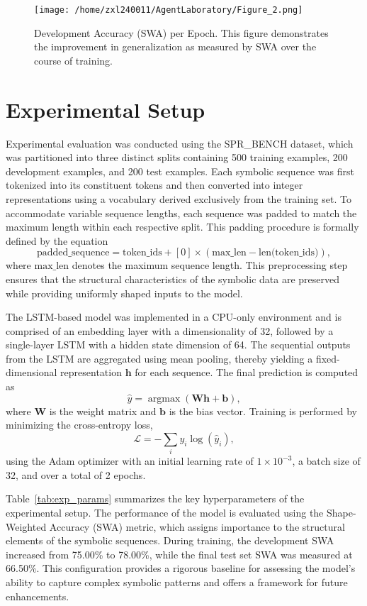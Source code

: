 \documentclass{article}
\begin{document}
\begin{figure}[h]
\caption{Development Accuracy (SWA) per Epoch. This figure demonstrates the improvement in generalization as measured by SWA over the course of training.}
\centering
\texttt{[image: /home/zxl240011/AgentLaboratory/Figure\_2.png]}
\label{fig:fig2}
\end{figure}

\section{Experimental Setup}
Experimental evaluation was conducted using the SPR\_BENCH dataset, which was partitioned into three distinct splits containing 500 training examples, 200 development examples, and 200 test examples. Each symbolic sequence was first tokenized into its constituent tokens and then converted into integer representations using a vocabulary derived exclusively from the training set. To accommodate variable sequence lengths, each sequence was padded to match the maximum length within each respective split. This padding procedure is formally defined by the equation 
\[
\text{padded\_sequence} = \text{token\_ids} + [0] \times (\text{max\_len} - \text{len(token\_ids)}),
\]
where \(\text{max\_len}\) denotes the maximum sequence length. This preprocessing step ensures that the structural characteristics of the symbolic data are preserved while providing uniformly shaped inputs to the model.

The LSTM-based model was implemented in a CPU-only environment and is comprised of an embedding layer with a dimensionality of 32, followed by a single-layer LSTM with a hidden state dimension of 64. The sequential outputs from the LSTM are aggregated using mean pooling, thereby yielding a fixed-dimensional representation \(\mathbf{h}\) for each sequence. The final prediction is computed as
\[
\hat{y} = \operatorname{argmax}\left(\mathbf{W}\mathbf{h} + \mathbf{b}\right),
\]
where \(\mathbf{W}\) is the weight matrix and \(\mathbf{b}\) is the bias vector. Training is performed by minimizing the cross-entropy loss,
\[
\mathcal{L} = -\sum_{i} y_i \log\left(\hat{y}_i\right),
\]
using the Adam optimizer with an initial learning rate of \(1\times10^{-3}\), a batch size of 32, and over a total of 2 epochs.

Table~\ref{tab:exp_params} summarizes the key hyperparameters of the experimental setup. The performance of the model is evaluated using the Shape-Weighted Accuracy (SWA) metric, which assigns importance to the structural elements of the symbolic sequences. During training, the development SWA increased from 75.00\% to 78.00\%, while the final test set SWA was measured at 66.50\%. This configuration provides a rigorous baseline for assessing the model's ability to capture complex symbolic patterns and offers a framework for future enhancements.
\end{document}
